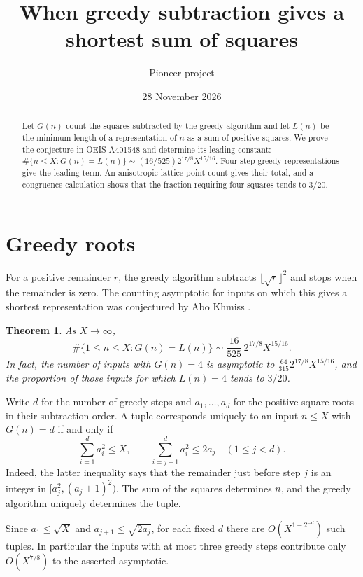 \documentclass[11pt]{article}
\title{When greedy subtraction gives a shortest sum of squares}
\author{Pioneer project}
\date{28 November 2026}
\newtheorem{theorem}{Theorem}
\begin{document}
\maketitle
\begin{abstract}
Let \(G(n)\) count the squares subtracted by the greedy algorithm and let \(L(n)\) be the minimum length of a representation of \(n\) as a sum of positive squares. We prove the conjecture in OEIS A401548 and determine its leading constant:
\(\#\{n\le X:G(n)=L(n)\}\sim (16/525)2^{17/8}X^{15/16}\).
Four-step greedy representations give the leading term. An anisotropic lattice-point count gives their total, and a congruence calculation shows that the fraction requiring four squares tends to \(3/20\).
\end{abstract}

\section{Greedy roots}

For a positive remainder \(r\), the greedy algorithm subtracts \(\lfloor\sqrt r\rfloor^2\) and stops when the remainder is zero. The counting asymptotic for inputs on which this gives a shortest representation was conjectured by Abo Khmiss \cite{oeis}.

\begin{theorem}\label{thm:main}
As \(X\to\infty\),
\[
\#\{1\le n\le X:G(n)=L(n)\}
 \sim \frac{16}{525}\,2^{17/8} X^{15/16}.
\]
In fact, the number of inputs with \(G(n)=4\) is asymptotic to
\(\frac{64}{315}2^{17/8}X^{15/16}\), and the proportion of those inputs for which \(L(n)=4\) tends to \(3/20\).
\end{theorem}

Write \(d\) for the number of greedy steps and \(a_1,\ldots,a_d\) for the positive square roots in their subtraction order. A tuple corresponds uniquely to an input \(n\le X\) with \(G(n)=d\) if and only if
\[
 \sum_{i=1}^d a_i^2\le X,\qquad
 \sum_{i=j+1}^d a_i^2\le 2a_j\quad (1\le j<d).                 \tag{1}\label{eq:constraints}
\]
Indeed, the latter inequality says that the remainder just before step \(j\) is an integer in \([a_j^2,(a_j+1)^2)\). The sum of the squares determines \(n\), and the greedy algorithm uniquely determines the tuple.

Since \(a_1\le\sqrt X\) and \(a_{j+1}\le\sqrt{2a_j}\), for each fixed \(d\) there are \(O(X^{1-2^{-d}})\) such tuples. In particular the inputs with at most three greedy steps contribute only \(O(X^{7/8})\) to the asserted asymptotic.
\end{document}
